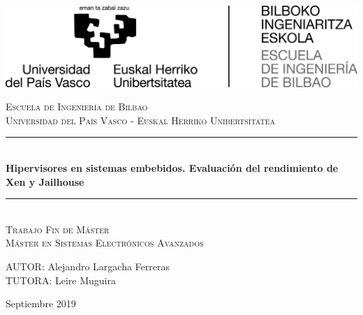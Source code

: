 \begin{titlepage}

\newcommand{\HRule}{\rule{\linewidth}{0.5mm}} %

\center %

\begin{flushright}
\includegraphics[scale=0.35]{recursos/Escuela_Ingenieria_Bizkaia_bilingue_positivo_alta.jpg}
\\[3cm]
\end{flushright}

\textsc{\Large Escuela de Ingeniería de Bilbao}\\[0.5cm]
\textsc{\large Universidad del País Vasco - Euskal Herriko Unibertsitatea}
\\[2cm]


 \HRule \\[0.4cm]
{ \huge \bfseries Hipervisores en sistemas embebidos. Evaluación del rendimiento de Xen y Jailhouse }\\[0.4cm] %
\HRule \\[2.0cm]

\textsc{\LARGE Trabajo Fin de Máster}\\[0.5cm]
\textsc{\Large Máster en Sistemas Electrónicos Avanzados }\\[2.0cm]

\begin{flushright}
\large
AUTOR: Alejandro Largacha Ferreras\\ %
TUTORA: Leire Muguira %
\end{flushright}

\vspace{1.1cm}

{ { Septiembre 2019}}\\[3cm] %

\vfill %

\end{titlepage}
